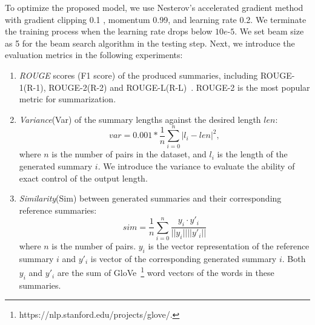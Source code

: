 To optimize the proposed model,
we use Nesterov's
accelerated gradient method \cite{SutskeverMDH13} with gradient clipping 0.1 \cite{PascanuMB13}, momentum 0.99,
and learning rate 0.2.
We terminate the training process when the learning rate drops below $10e$-$5$.
We set beam size as 5 for the beam search algorithm in the testing step.
%
%
Next, we introduce the evaluation metrics in the following experiments:
\begin{enumerate}
\item \textit{ROUGE} scores (F1 score) of the produced
summaries, including ROUGE-1(R-1), ROUGE-2(R-2) and
ROUGE-L(R-L)~\cite{rouge-a-package-for-automatic-evaluation-of-summaries}.
ROUGE-2 is the most popular metric for summarization.

\item \textit{Variance}(Var) of the summary lengths against
the desired length $len$:
\begin{equation}
var = 0.001 * \frac{1}{n}\sum_{i=0}^{n} |l_i - len|^2, 
\end{equation}
where $n$ is the number of pairs in the dataset, and $l_i$ is the length of
the generated summary $i$. 
We introduce the variance to evaluate the
ability of exact control of the output length.

\item \textit{Similarity}(Sim) between generated summaries
and their corresponding reference summaries:
\begin{equation}
sim = \frac{1}{n}\sum_{i=0}^{n} \frac{y_{i}\cdot y'_{i}}{||y_{i}|| ||y'_{i}||}
\end{equation}
where $n$ is the number of pairs. 
$y_i$ is
the vector representation of the reference summary $i$ and $y'_{i}$ is 
vector of the corresponding generated summary $i$.
Both $y_i$ and $y'_i$ are the sum of
GloVe~\footnote{https://nlp.stanford.edu/projects/glove/.} word vectors of
the words in these summaries. 
\end{enumerate}

